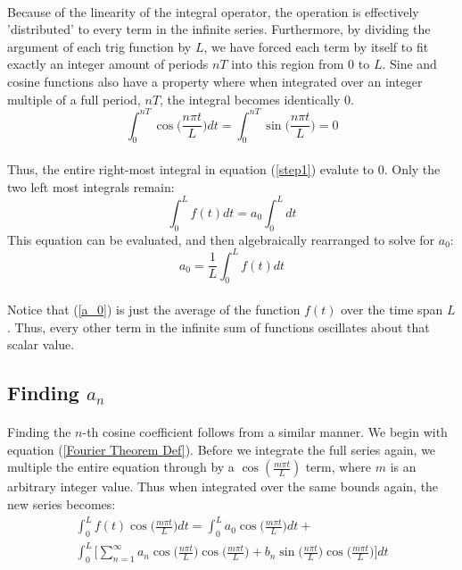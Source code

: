 \documentclass[12pt,letterpaper]{article}
\begin{document}
\paragraph*{}Because of the linearity of the integral operator, the operation is effectively 'distributed' to every term in the infinite series. Furthermore, by dividing the argument of each trig function by $L$, we have forced each term by itself to fit exactly an integer amount of periods $nT$ into this region from $0$ to $L$. Sine and cosine functions also have a property where when integrated over an integer multiple of a full period, $nT$, the integral becomes identically $0$.
\begin{equation}
\int_0^{nT}\cos\Big(\frac{n\pi t}{L}\Big) dt = 
\int_0^{nT}\sin\Big(\frac{n\pi t}{L}\Big) = 0 
\end{equation}
\paragraph*{}Thus, the entire right-most integral in equation (\ref{step1}) evalute to $0$. Only the two left most integrals remain:
\begin{equation}
\int_0^L f(t) dt = a_0 \int_0^L dt 
\end{equation}
This equation can be evaluated, and then algebraically rearranged to solve for $a_0$:
\begin{equation}
\label{a_0}
a_0 = \frac{1}{L}\int_0^L f(t) dt
\end{equation}
\paragraph*{}Notice that (\ref{a_0}) is just the average of the function $f(t)$ over the time span $L$. Thus, every other term in the infinite sum of functions oscillates about that scalar value.


\subsection{Finding $a_n$}
\paragraph*{}Finding the $n$-th cosine coefficient follows from a similar manner. We begin with equation (\ref{Fourier Theorem Def}). Before we integrate the full series again, we multiple the entire equation through by a $\cos(\frac{m\pi t}{L})$ term, where $m$ is an arbitrary integer value. Thus when integrated over the same bounds again, the new series becomes:
\begin{multline}
\label{step2}
\int_0^L f(t)\cos\Big(\frac{m\pi t}{L}\Big) dt = 
\int_0^L a_0\cos\Big(\frac{m\pi t}{L}\Big) dt +  \\
\int_0^L \Bigg[ \sum_{n=1}^{\infty} 
a_n \cos\Big(\frac{n\pi t}{L}\Big)\cos\Big(\frac{m\pi t}{L}\Big) + 
b_n \sin\Big(\frac{n\pi t}{L}\Big)\cos\Big(\frac{m\pi t}{L}\Big) \Bigg] dt
\end{multline}
\end{document}
